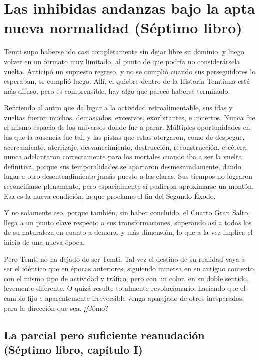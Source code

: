 \documentclass[
]{book}
\begin{document}
\hypertarget{las-inhibidas-andanzas-bajo-la-apta-nueva-normalidad-suxe9ptimo-libro}{%
\chapter{Las inhibidas andanzas bajo la apta nueva normalidad (Séptimo libro)}\label{las-inhibidas-andanzas-bajo-la-apta-nueva-normalidad-suxe9ptimo-libro}}

Temti supo haberse ido casi completamente sin dejar libre su dominio, y luego volver en un formato muy limitado, al punto de que podría no considerársela vuelta. Anticipó un supuesto regreso, y no se cumplió cuando sus perseguidores lo esperaban, se cumplió luego. Allí, el quiebre dentro de la Historia Temtiana está más difuso, pero es comprensible, hay algo que parece haberse terminado.

Refiriendo al antro que da lugar a la actividad retroalimentable, sus idas y vueltas fueron muchos, demasiados, excesivos, exorbitantes, e inciertos. Nunca fue el mismo espacio de los universos donde fue a parar. Múltiples oportunidades en las que la ausencia fue tal, y las pistas que estas otorgaron, como de despegue, acercamiento, aterrizaje, desvanecimiento, destrucción, reconstrucción, etcétera, nunca adelantaron correctamente para los mortales cuando iba a ser la vuelta definitiva, porque sus temporalidades se apartaron desmesuradamente, dando lugar a otro desentendimiento jamás puesto a las claras. Sus tiempos no lograron reconciliarse plenamente, pero espacialmente sí pudieron aproximarse un montón. Esa es la nueva condición, la que proclama el fin del Segundo Éxodo.

Y no solamente eso, porque también, sin haber concluido, el Cuarto Gran Salto, llega a un punto clave respecto a sus transformaciones, superando así a todos los de su naturaleza en cuanto a demora, y más dimensión, lo que a la vez implica el inicio de una nueva época.

Pero Temti no ha dejado de ser Temti. Tal vez el destino de su realidad vaya a ser el idéntico que en épocas anteriores, siguiendo inmersa en su antiguo contexto, con el mismo tipo de actividad y tráfico, pero con un color, en su doble sentido, levemente diferente. O quizá resulte totalmente revolucionario, haciendo que el cambio fijo e aparentemente irreversible venga aparejado de otros inesperados, para la dirección que sea. ¿Cómo?

\hypertarget{la-parcial-pero-suficiente-reanudaciuxf3n-suxe9ptimo-libro-capuxedtulo-i}{%
\section{La parcial pero suficiente reanudación (Séptimo libro, capítulo I)}\label{la-parcial-pero-suficiente-reanudaciuxf3n-suxe9ptimo-libro-capuxedtulo-i}}
\end{document}
